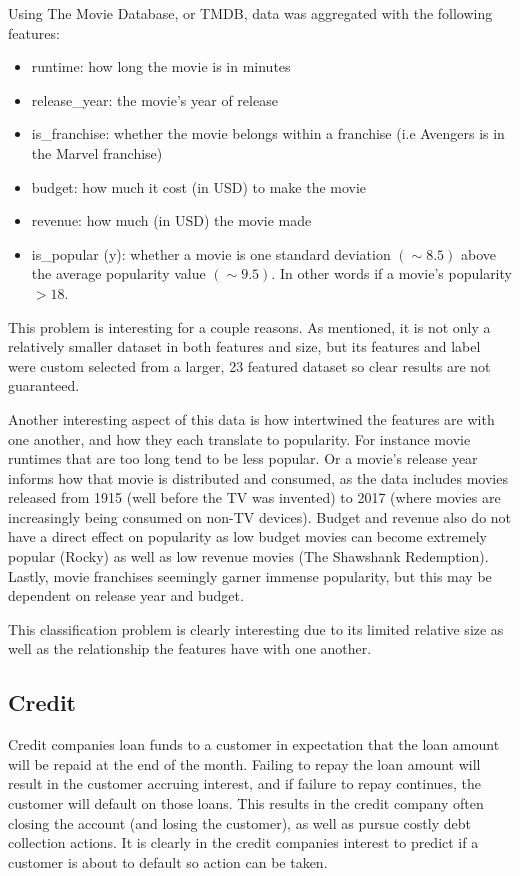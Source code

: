 \documentclass{article}
\begin{document}
Using The Movie Database, or TMDB, data was aggregated with the following features:
\begin{itemize}
    \item runtime: how long the movie is in minutes
    \item release\_year: the movie's year of release
    \item is\_franchise: whether the movie belongs within a franchise (i.e Avengers is in the Marvel franchise)
    \item budget: how much it cost (in USD) to make the movie
    \item revenue: how much (in USD) the movie made
    \item is\_popular (y): whether a movie is one standard deviation $(\sim 8.5)$ above the average popularity value $(\sim 9.5)$. In other words if a movie's popularity $>18$.
\end{itemize}
This problem is interesting for a couple reasons. As mentioned, it is not only a relatively smaller dataset in both features and size, but its features and label were custom selected from a larger, 23 featured dataset so clear results are not guaranteed.

Another interesting aspect of this data is how intertwined the features are with one another, and how they each translate to popularity. For instance movie runtimes that are too long tend to be less popular. Or a movie's release year informs how that movie is distributed and consumed, as the data includes movies released from 1915 (well before the TV was invented) to 2017 (where movies are increasingly being consumed on non-TV devices). Budget and revenue also do not have a direct effect on popularity as low budget movies can become extremely popular (Rocky) as well as low revenue movies (The Shawshank Redemption). Lastly, movie franchises seemingly garner immense popularity, but this may be dependent on release year and budget.

This classification problem is clearly interesting due to its limited relative size as well as the relationship the features have with one another.

\subsection{Credit}

Credit companies loan funds to a customer in expectation that the loan amount will be repaid at the end of the month. Failing to repay the loan amount will result in the customer accruing interest, and if failure to repay continues, the customer will default on those loans. This results in the credit company often closing the account (and losing the customer), as well as pursue costly debt collection actions. It is clearly in the credit companies interest to predict if a customer is about to default so action can be taken.
\end{document}

